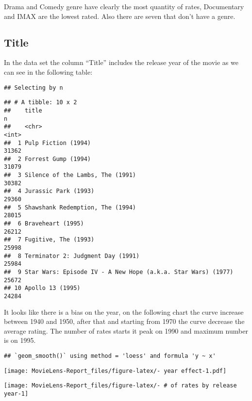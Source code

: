 \documentclass[
]{article}
\begin{document}
Drama and Comedy genre have clearly the most quantity of rates,
Documentary and IMAX are the lowest rated. Also there are seven that
don't have a genre.

\hypertarget{title}{%
\subsection{Title}\label{title}}

In the data set the column ``Title'' includes the release year of the
movie as we can see in the following table:

\begin{verbatim}
## Selecting by n
\end{verbatim}

\begin{verbatim}
## # A tibble: 10 x 2
##    title                                                            n
##    <chr>                                                        <int>
##  1 Pulp Fiction (1994)                                          31362
##  2 Forrest Gump (1994)                                          31079
##  3 Silence of the Lambs, The (1991)                             30382
##  4 Jurassic Park (1993)                                         29360
##  5 Shawshank Redemption, The (1994)                             28015
##  6 Braveheart (1995)                                            26212
##  7 Fugitive, The (1993)                                         25998
##  8 Terminator 2: Judgment Day (1991)                            25984
##  9 Star Wars: Episode IV - A New Hope (a.k.a. Star Wars) (1977) 25672
## 10 Apollo 13 (1995)                                             24284
\end{verbatim}

It looks like there is a bias on the year, on the following chart the
curve increase between 1940 and 1950, after that and starting from 1970
the curve decrease the average rating. The number of rates starts it
peak on 1990 and maximum number is on 1995.

\begin{verbatim}
## `geom_smooth()` using method = 'loess' and formula 'y ~ x'
\end{verbatim}

\texttt{[image: MovieLens-Report\_files/figure-latex/- year effect-1.pdf]}

\begin{center}\texttt{[image: MovieLens-Report\_files/figure-latex/- \# of rates by release year-1]} \end{center}
\end{document}
